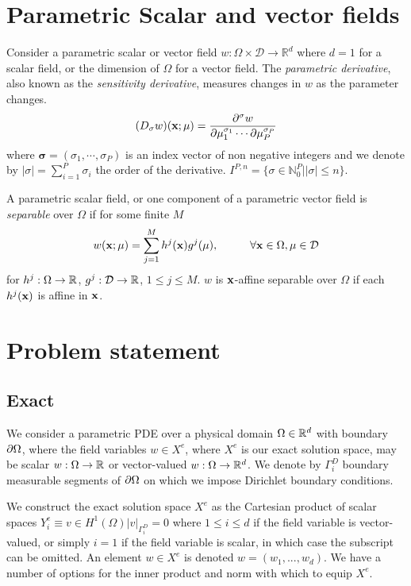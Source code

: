 \section{Parametric Scalar and vector fields}
Consider a parametric scalar or vector field $w:\Omega \times \mathcal{D}\rightarrow \mathbb{R}^d$ where $d=1$ for a scalar field, or the dimension of $\Omega$ for a vector field. The \textit{parametric derivative}, also known as the \textit{sensitivity derivative},  measures changes in $w$ as the parameter changes. 
\begin{equation}
(D_{\mathbf{\sigma}}w)(\mathbf{x};\mathbf{\mu})=\frac{{\partial}^{\mathbf{\sigma}} w}{{\partial} \mu_1^{\sigma_1}\cdots {\partial} \mu_P^{\sigma_P} }
\end{equation}
where $\mathbf{\sigma}=(\sigma_1,\cdots,\sigma_P)$ is an index vector of non negative integers and we denote by $|\sigma|=\sum_{i=1}^P \sigma_i$ the order of the derivative. $I^{P,n}= \lbrace \sigma \in \mathbb{N}^P_0 | |\sigma| \leq n \rbrace$.

A parametric scalar field, or one component of a parametric vector field is \textit{separable} over $\Omega$ if for some finite $M$ 
\begin{equation}
w({\mathbf{x}} ; {\mathbf{\mu}}) = \sum^M_{j=1}h^j({\mathbf{x}})g^j({\mathbf{\mu}}), \hspace{1cm} \forall {\mathbf{x}} \in \Omega, {\mathbf{\mu}} \in \mathcal{D}
\end{equation}
for $h^j:\Omega \rightarrow \mathbb{R}$, $g^j:\mathcal{D} \rightarrow \mathbb{R}$, $1 \leq j \leq M$. $w$ is ${\mathbf{x}}$-affine separable over $\Omega$ if each $h^j({\mathbf{x}})$ is affine in ${\mathbf{x}}$.

\section{Problem statement}
\subsection{Exact}
We consider a parametric PDE over a physical domain $\Omega \in \mathbb{R}^d$ with boundary ${\partial} \Omega$, where the field variables $w \in X^e$, where $X^e$ is our exact solution space, may be scalar $w:\Omega \rightarrow \mathbb{R}$ or vector-valued $w:\Omega \rightarrow \mathbb{R}^d$. We denote by $\Gamma^D_i$ boundary measurable segments of ${\partial} \Omega$ on which we impose Dirichlet boundary conditions.

We construct the exact solution space $X^e$ as the Cartesian product of scalar spaces $Y^e_i\equiv {v \in H^1}(\Omega) | v|_{\Gamma^D_i}=0$ where $1\leq i \leq d$ if the field variable is vector-valued, or simply $i=1$ if the field variable is scalar, in which case the subscript can be omitted. An element $w\in X^e$ is denoted $w=(w_1,...,w_d)$. We have a number of options for the inner product and norm with which to equip $X^e$.

